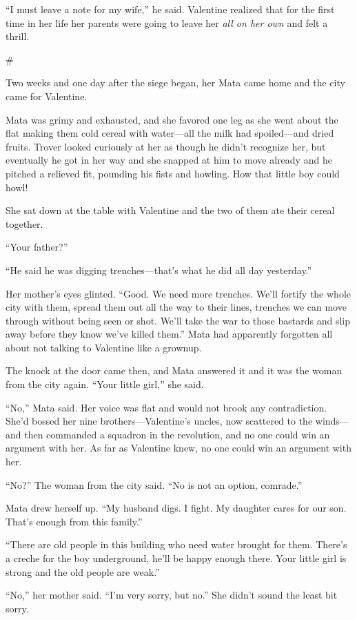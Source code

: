 “I must leave a note for my wife,” he said. Valentine realized that
for the first time in her life her parents were going to leave her
\emph{all on her own} and felt a thrill.

\#

Two weeks and one day after the siege began, her Mata came home and
the city came for Valentine.

Mata was grimy and exhausted, and she favored one leg as she went
about the flat making them cold cereal with water—all the milk had
spoiled—and dried fruits. Trover looked curiously at her as though
he didn’t recognize her, but eventually he got in her way and she
snapped at him to move already and he pitched a relieved fit,
pounding his fists and howling. How that little boy could howl!

She sat down at the table with Valentine and the two of them ate
their cereal together.

“Your father?”

“He said he was digging trenches—that’s what he did all day
yesterday.”

Her mother’s eyes glinted. “Good. We need more trenches. We’ll
fortify the whole city with them, spread them out all the way to
their lines, trenches we can move through without being seen or
shot. We’ll take the war to those bastards and slip away before
they know we’ve killed them.” Mata had apparently forgotten all
about not talking to Valentine like a grownup.

The knock at the door came then, and Mata answered it and it was
the woman from the city again. “Your little girl,” she said.

“No,” Mata said. Her voice was flat and would not brook any
contradiction. She’d bossed her nine brothers—Valentine’s uncles,
now scattered to the winds—and then commanded a squadron in the
revolution, and no one could win an argument with her. As far as
Valentine knew, no one could win an argument with her.

“No?” The woman from the city said. “No is not an option,
comrade.”

Mata drew herself up. “My husband digs. I fight. My daughter cares
for our son. That’s enough from this family.”

“There are old people in this building who need water brought for
them. There’s a creche for the boy underground, he’ll be happy
enough there. Your little girl is strong and the old people are
weak.”

“No,” her mother said. “I’m very sorry, but no.” She didn’t sound
the least bit sorry.

